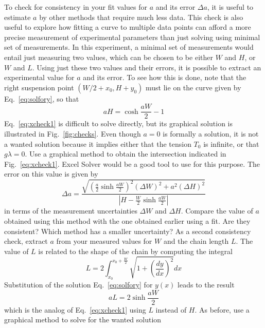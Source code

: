 \documentclass{revtex4}
\begin{document}
To check for consistency in your fit values for $a$ and its error $\Delta a$,
it is useful to estimate $a$ by other methods that require much less data. This
check is also useful to explore how fitting a curve to multiple data points can
afford a more precise measurement of experimental parameters than just solving
using minimal set of measurements. In this experiment, a minimal set of
measurements would entail just measuring two values, which can be chosen to be
either $W$ and $H$, or $W$ and $L$.  Using just these two values and their
errors, it is possible to extract an experimental value for $a$ and its error.
To see how this is done, note that the right suspension point
$(W/2+x_0,H+y_0)$ must lie on the curve given by Eq.~\ref{eq:solfory}, so that
\begin{equation}
aH = \cosh{\frac{aW}{2}}-1
\label{eq:xcheck1}
\end{equation}
Eq.~\ref{eq:xcheck1} is difficult to solve directly, but its graphical solution
is illustrated in Fig.~\ref{fig:checks}. Even though $a = 0$ is formally a
solution, it is not a wanted solution because it implies either that the
tension $T_0$ is infinite, or that $g\lambda = 0$. Use a graphical method
to obtain the intersection indicated in Fig.~\ref{eq:xcheck1}. Excel Solver
would be a good tool to use for this purpose.  The error on
this value is given by
\begin{equation}
\Delta a = \frac{\sqrt{\left(\frac{a}{2}\sinh{\frac{aW}{2}}\right)^2
(\Delta W)^2 + a^2(\Delta H)^2}}
{\left| H-\frac{W}{2}\sinh{\frac{aW}{2}}\right|}
\label{eq:xcheck1err}
\end{equation}
in terms of the measurement uncertainties $\Delta W$ and $\Delta H$.
Compare the value of $a$ obtained using this method with the one obtained
earlier using a fit. Are they consistent? Which method has a smaller
uncertainty?  As a second consistency check, extract $a$ from your
measured values for $W$ and the chain length $L$. The value of $L$
is related to the shape of the chain by computing the integral
\begin{equation}
L=2\int_{x_0}^{x_0+\frac{W}{2}}\sqrt{1+\left(\frac{dy}{dx}\right)^2} dx
\label{eq:lengthint}
\end{equation}
Substitution of the solution Eq.~\ref{eq:solfory} for $y(x)$ leads to the
result
\begin{equation}
aL = 2\sinh{\frac{aW}{2}}
\label{eq:xcheck2}
\end{equation}
which is the analog of Eq.~\ref{eq:xcheck1} using $L$ instead of $H$.
As before, use a graphical method to solve for the wanted solution
\end{document}
